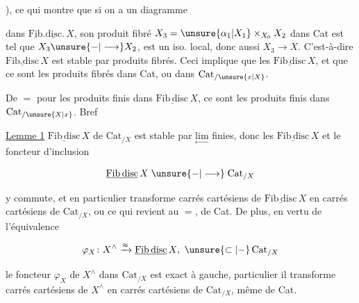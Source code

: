 ), ce qui montre que si on a un diagramme


dans $\underline{\mathrm{Fib}}.\underline{\mathrm{disc}}.\,X$, son produit fibré $X_3=\unsure{\alpha_1|X_1}\times_{X_0}X_2$ dans Cat est tel que $X_3\unsure{-|\longrightarrow}X_2$, est un iso. local, donc aussi $X_3\longrightarrow X$. C'est-à-dire $\underline{\mathrm{Fib.disc}}\,X$ est stable par produits fibrés. Ceci implique que les   $\underline{\mathrm{Fib\,disc}}\,X$, et que ce sont les produits fibrés dans Cat, ou dans $\mathrm{Cat}_{/\unsure{x|X}}$.

De $=$ pour les produits  finis dans  $\underline{\mathrm{Fib\,disc}}\,X$, ce sont les produits finis dans $\mathrm{Cat}_{/\unsure{X|x}}$. Bref

\uline{Lemme 1}    $\underline{\mathrm{Fib\,disc}}\,X$ de $\mathrm{Cat}_{/X}$ est stable par $\underset{\leftarrow}{\mathrm{lim}}$ finies, donc les   $\underline{\mathrm{Fib\,disc}}\,X$  et le foncteur d'inclusion

\[
\underline{\mathrm{Fib\,disc}}\,X\mathrel{\unsure{-|\longrightarrow}}\mathrm{Cat}_{/X}
\]

y commute, et en particulier transforme carrés cartésiens de $\underline{\mathrm{Fib\,disc}}\,X$ en carrés cartésiens de $\mathrm{Cat}_{/X}$, ou ce qui revient au $=$, de Cat. De plus, en vertu de l'équivalence

\[
\varphi_X\colon X^\wedge\xrightarrow{\approx}\underline{\mathrm{Fib\,disc}}\,X,\ \unsure{\subset|-}\,\mathrm{Cat}_{/X}
\]

le foncteur $\varphi_X$ de $X^\wedge$ dans $\mathrm{Cat}_{/X}$ est exact à gauche,  particulier il transforme carrés cartésiens de $X^\wedge$ en carrés cartésiens de $\mathrm{Cat}_{/X}$,  même de Cat.

